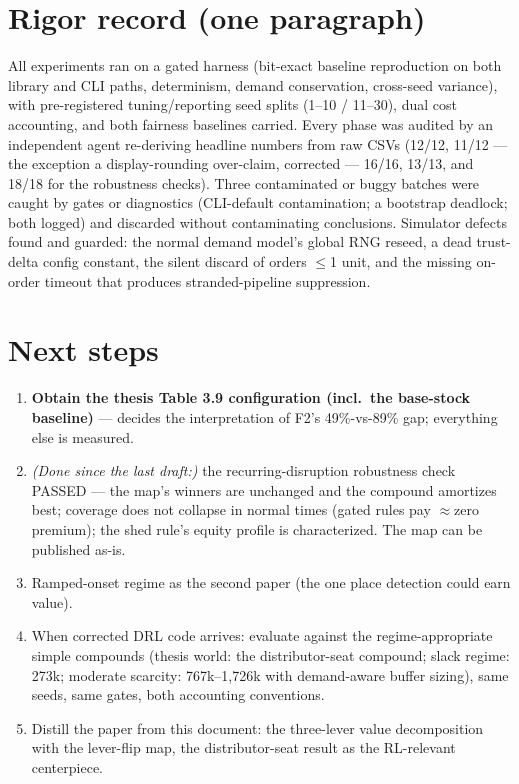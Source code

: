 \documentclass[11pt]{article}
\begin{document}
\section{Rigor record (one paragraph)}
All experiments ran on a gated harness (bit-exact baseline reproduction on both library and
CLI paths, determinism, demand conservation, cross-seed variance), with pre-registered
tuning/reporting seed splits (1--10 / 11--30), dual cost accounting, and both fairness
baselines carried. Every phase was audited by an independent agent re-deriving headline
numbers from raw CSVs (12/12, 11/12 --- the exception a display-rounding over-claim,
corrected --- 16/16, 13/13, and 18/18 for the robustness checks). Three contaminated or
buggy batches were caught by gates or
diagnostics (CLI-default contamination; a bootstrap deadlock; both logged) and discarded
without contaminating conclusions. Simulator defects found and guarded: the normal demand
model's global RNG reseed, a dead trust-delta config constant, the silent discard of
orders $\le$1 unit, and the missing on-order timeout that produces stranded-pipeline
suppression.

\section{Next steps}
\begin{enumerate}
\item \textbf{Obtain the thesis Table 3.9 configuration (incl.\ the base-stock baseline)} ---
decides the interpretation of F2's 49\%-vs-89\% gap; everything else is measured.
\item \emph{(Done since the last draft:)} the recurring-disruption robustness check
PASSED --- the map's winners are unchanged and the compound amortizes best; coverage does
not collapse in normal times (gated rules pay $\approx$zero premium); the shed rule's
equity profile is characterized. The map can be published as-is.
\item Ramped-onset regime as the second paper (the one place detection could earn value).
\item When corrected DRL code arrives: evaluate against the regime-appropriate simple
compounds (thesis world: the distributor-seat compound; slack regime: 273k; moderate
scarcity: 767k--1,726k with demand-aware buffer sizing), same seeds, same gates, both
accounting conventions.
\item Distill the paper from this document: the three-lever value decomposition with the
lever-flip map, the distributor-seat result as the RL-relevant centerpiece.
\end{enumerate}
\end{document}
